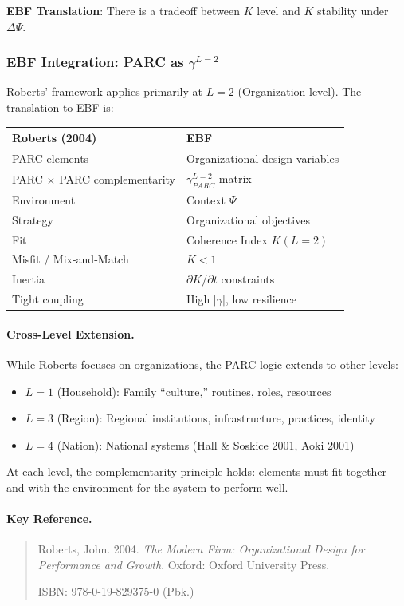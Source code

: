 \textbf{EBF Translation}: There is a tradeoff between $K$ level and 
$K$ stability under $\Delta\Psi$.

\subsubsection{EBF Integration: PARC as $\gamma^{L=2}$}

Roberts' framework applies primarily at $L = 2$ (Organization level).
The translation to EBF is:

\begin{center}
\renewcommand{\arraystretch}{1.4}
\begin{tabular}{|l|l|}
\hline
\textbf{Roberts (2004)} & \textbf{EBF} \\
\hline
PARC elements & Organizational design variables \\
PARC $\times$ PARC complementarity & $\gamma^{L=2}_{PARC}$ matrix \\
Environment & Context $\Psi$ \\
Strategy & Organizational objectives \\
Fit & Coherence Index $K(L=2)$ \\
Misfit / Mix-and-Match & $K < 1$ \\
Inertia & $\partial K / \partial t$ constraints \\
Tight coupling & High $|\gamma|$, low resilience \\
\hline
\end{tabular}
\end{center}

\paragraph{Cross-Level Extension.}
While Roberts focuses on organizations, the PARC logic extends to other levels:
\begin{itemize}
    \item $L = 1$ (Household): Family ``culture,'' routines, roles, resources
    \item $L = 3$ (Region): Regional institutions, infrastructure, practices, identity
    \item $L = 4$ (Nation): National systems (Hall \& Soskice 2001, Aoki 2001)
\end{itemize}

At each level, the complementarity principle holds: elements must fit together
and with the environment for the system to perform well.

\paragraph{Key Reference.}
\begin{quote}
Roberts, John. 2004. \textit{The Modern Firm: Organizational Design for 
Performance and Growth}. Oxford: Oxford University Press. 

ISBN: 978-0-19-829375-0 (Pbk.)
\end{quote}

